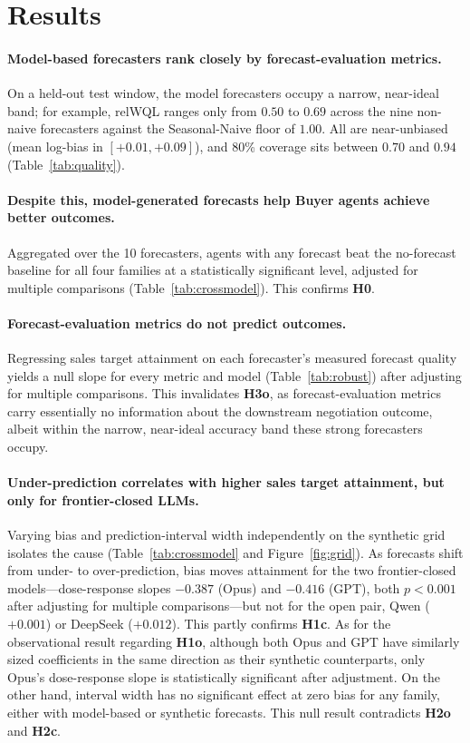 \documentclass{article}
\begin{document}
\section{Results}

\paragraph{Model-based forecasters rank closely by forecast-evaluation metrics.} On a held-out test window, the model forecasters occupy a narrow, near-ideal band; for example, relWQL ranges only from $0.50$ to $0.69$ across the nine non-naive forecasters against the Seasonal-Naive floor of $1.00$. All are near-unbiased (mean log-bias in $[+0.01,+0.09]$), and 80\% coverage sits between $0.70$ and $0.94$ (Table~\ref{tab:quality}).

\paragraph{Despite this, model-generated forecasts help Buyer agents achieve better outcomes.} Aggregated over the 10 forecasters, agents with any forecast beat the no-forecast baseline for all four families at a statistically significant level, adjusted for multiple comparisons (Table~\ref{tab:crossmodel}). This confirms \textbf{H0}.

\paragraph{Forecast-evaluation metrics do not predict outcomes.} Regressing sales target attainment on each forecaster's measured forecast quality yields a null slope for every metric and model (Table~\ref{tab:robust}) after adjusting for multiple comparisons. This invalidates \textbf{H3o}, as forecast-evaluation metrics carry essentially no information about the downstream negotiation outcome, albeit within the narrow, near-ideal accuracy band these strong forecasters occupy.

\paragraph{Under-prediction correlates with higher sales target attainment, but only for frontier-closed LLMs.} Varying bias and prediction-interval width independently on the synthetic grid isolates the cause (Table~\ref{tab:crossmodel} and Figure~\ref{fig:grid}). As forecasts shift from under- to over-prediction, bias moves attainment for the two frontier-closed models---dose-response slopes $-0.387$ (Opus) and $-0.416$ (GPT), both $p<0.001$ after adjusting for multiple comparisons---but not for the open pair, Qwen ($+0.001$) or DeepSeek ($+0.012$). This partly confirms \textbf{H1c}. As for the observational result regarding \textbf{H1o}, although both Opus and GPT have similarly sized coefficients in the same direction as their synthetic counterparts, only Opus's dose-response slope is statistically significant after adjustment. On the other hand, interval width has no significant effect at zero bias for any family, either with model-based or synthetic forecasts. This null result contradicts \textbf{H2o} and \textbf{H2c}.
\end{document}
